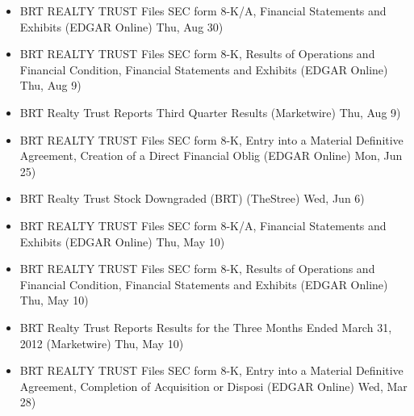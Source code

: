 \documentclass[11pt,asymmetric]{article}
\begin{document}
\begin{itemize}
\item BRT REALTY TRUST Files SEC form 8-K/A, Financial Statements and Exhibits (EDGAR Online) Thu, Aug 30)
\item BRT REALTY TRUST Files SEC form 8-K, Results of Operations and Financial Condition, Financial Statements and Exhibits (EDGAR Online) Thu, Aug 9)
\item BRT Realty Trust Reports Third Quarter Results (Marketwire) Thu, Aug 9)
\item BRT REALTY TRUST Files SEC form 8-K, Entry into a Material Definitive Agreement, Creation of a Direct Financial Oblig (EDGAR Online) Mon, Jun 25)
\item BRT Realty Trust Stock Downgraded (BRT) (TheStree) Wed, Jun 6)
\item BRT REALTY TRUST Files SEC form 8-K/A, Financial Statements and Exhibits (EDGAR Online) Thu, May 10)
\item BRT REALTY TRUST Files SEC form 8-K, Results of Operations and Financial Condition, Financial Statements and Exhibits (EDGAR Online) Thu, May 10)
\item BRT Realty Trust Reports Results for the Three Months Ended March 31, 2012 (Marketwire) Thu, May 10)
\item BRT REALTY TRUST Files SEC form 8-K, Entry into a Material Definitive Agreement, Completion of Acquisition or Disposi (EDGAR Online) Wed, Mar 28)
\end{itemize}
\end{document}
